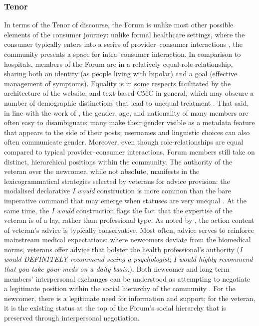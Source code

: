 
\subsubsection{Tenor}

In terms of the Tenor of discourse, the \gls{Forum} is unlike most other possible elements of the consumer journey: unlike formal healthcare settings, where the consumer typically enters into a series of provider--consumer interactions \cite{slade_emergency_2008}, the community presents a space for intra--consumer interaction. In comparison to hospitals, \glspl{member} of the Forum are in a relatively equal role\hyp{}relationship, sharing both an identity (as people living with \gls{bipolar}) and a goal (effective management of symptoms). Equality is in some respects facilitated by the architecture of the website, and text\hyp{}based \gls{CMC} in general, which may obscure a number of demographic distinctions that lead to unequal treatment \cite{walther_computer-mediated_1996}. That said, in line with the work of \textcite{herring_computer-mediated_2001}, the gender, age, and nationality of many \glspl{member} are often easy to disambiguate: many  make their gender visible as a metadata feature that appears to the side of their \glspl{post}; usernames and linguistic choices can also often communicate gender. Moreover, even though role\hyp{}relationships are equal compared to typical provider--consumer interactions, \gls{Forum} \glspl{member} still take on distinct, hierarchical positions within the community. The authority of the veteran over the newcomer, while not absolute, manifests in the lexicogrammatical strategies selected by veterans for advice provision: the modalised declarative \emph{I would} construction is more common than the bare imperative command that may emerge when statuses are very unequal \cite{decapua_`if_1995}. At the same time, the \emph{I would} construction flags the fact that the expertise of the veteran is of a lay, rather than professional type. As noted by \textcite{smithson_membership_2011}, the action content of veteran's advice is typically conservative. Most often, advice serves to reinforce mainstream medical expectations: where newcomers deviate from the biomedical norms, veterans offer advice that bolster the health professional's authority (\emph{I would DEFINITELY recommend seeing a psychologist}; \emph{I would highly recommend that you take your meds on a daily basis.}). Both newcomer and long-term members' interpersonal exchanges can be understood as attempting to negotiate a legitimate position within the social hierarchy of the community \cite{varga2014grieving,koteyko2015performing}. For the newcomer, there is a legitimate need for information and support; for the veteran, it is the existing status at the top of the Forum's social hierarchy that is preserved through interpersonal negotiation.

